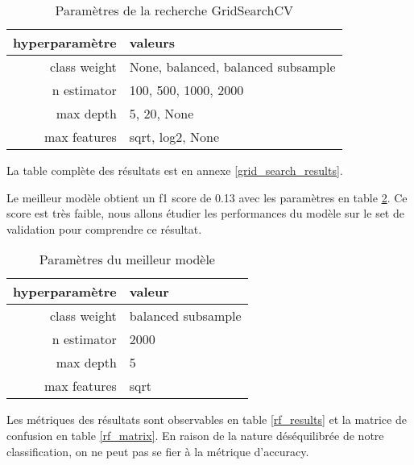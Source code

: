 \begin{table}[H]
    \begin{center}
        \caption{\label{grid_params}Paramètres de la recherche GridSearchCV}
        \begin{tabular}{r|l}
            hyperparamètre & valeurs                            \\ \hline
            class weight   & None, balanced, balanced subsample \\
            n estimator    & 100, 500, 1000, 2000               \\
            max depth      & 5, 20, None                        \\
            max features   & sqrt, log2, None                   \\
        \end{tabular}
    \end{center}
\end{table}

La table complète des résultats est en annexe \ref{grid_search_results}.

Le meilleur modèle obtient un f1 score de 0.13 avec les paramètres en table \ref{rf_params}.
Ce score est très faible, nous allons étudier les performances du modèle sur le set de validation pour comprendre ce résultat.

\begin{table}[H]
    \begin{center}
        \caption{\label{rf_params}Paramètres du meilleur modèle}
        \begin{tabular}{r|l}
            hyperparamètre & valeur             \\ \hline
            class weight   & balanced subsample \\
            n estimator    & 2000               \\
            max depth      & 5                  \\
            max features   & sqrt               \\
        \end{tabular}
    \end{center}
\end{table}

Les métriques des résultats sont observables en table \ref{rf_results} et la matrice de confusion en table \ref{rf_matrix}.
En raison de la nature déséquilibrée de notre classification, on ne peut pas se fier à la métrique d'accuracy.

